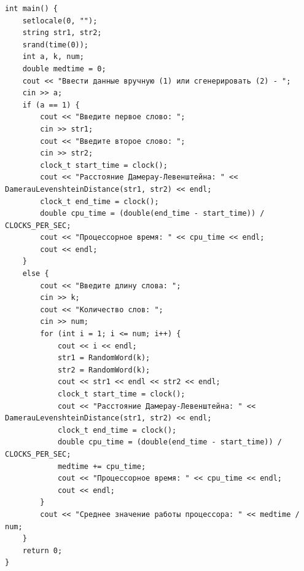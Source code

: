 \documentclass[12pt, a4paper]{article}
\begin{document}
\begin{lstlisting}[caption={Расстояние Дамерау-Левенштейна нерекурсивный метод, используя матрицу},label={lst:label2}]
int main() {
	setlocale(0, "");
	string str1, str2;
	srand(time(0));
	int a, k, num;
	double medtime = 0;
	cout << "Ввести данные вручную (1) или сгенерировать (2) - ";
	cin >> a;
	if (a == 1) {
		cout << "Введите первое слово: ";
		cin >> str1;
		cout << "Введите второе слово: ";
		cin >> str2;
		clock_t start_time = clock();
		cout << "Расстояние Дамерау-Левенштейна: " << DamerauLevenshteinDistance(str1, str2) << endl;
		clock_t end_time = clock();
		double cpu_time = (double(end_time - start_time)) / CLOCKS_PER_SEC;
		cout << "Процессорное время: " << cpu_time << endl;
		cout << endl;
	}
	else {
		cout << "Введите длину слова: ";
		cin >> k;
		cout << "Количество слов: ";
		cin >> num;
		for (int i = 1; i <= num; i++) {
			cout << i << endl;
			str1 = RandomWord(k);
			str2 = RandomWord(k);
			cout << str1 << endl << str2 << endl;
			clock_t start_time = clock();
			cout << "Расстояние Дамерау-Левенштейна: " << DamerauLevenshteinDistance(str1, str2) << endl;
			clock_t end_time = clock();
			double cpu_time = (double(end_time - start_time)) / CLOCKS_PER_SEC;
			medtime += cpu_time;
			cout << "Процессорное время: " << cpu_time << endl;
			cout << endl;		
		}
		cout << "Среднее значение работы процессора: " << medtime / num;
	}
	return 0;
}
\end{lstlisting}
\end{document}
